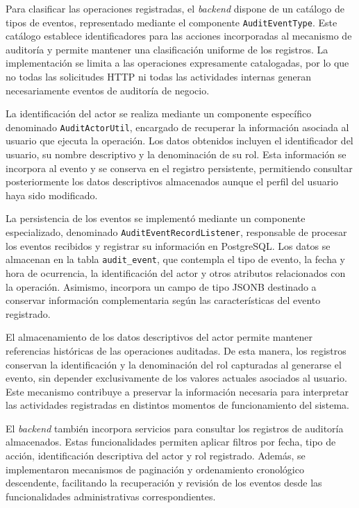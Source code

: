 Para clasificar las operaciones registradas, el \textit{backend} dispone de un catálogo de tipos de eventos, representado mediante el componente \texttt{AuditEventType}. Este catálogo establece identificadores para las acciones incorporadas al mecanismo de auditoría y permite mantener una clasificación uniforme de los registros. La implementación se limita a las operaciones expresamente catalogadas, por lo que no todas las solicitudes HTTP ni todas las actividades internas generan necesariamente eventos de auditoría de negocio.

La identificación del actor se realiza mediante un componente específico denominado \texttt{AuditActorUtil}, encargado de recuperar la información asociada al usuario que ejecuta la operación. Los datos obtenidos incluyen el identificador del usuario, su nombre descriptivo y la denominación de su rol. Esta información se incorpora al evento y se conserva en el registro persistente, permitiendo consultar posteriormente los datos descriptivos almacenados aunque el perfil del usuario haya sido modificado.

La persistencia de los eventos se implementó mediante un componente
especializado, denominado \texttt{AuditEventRecordListener},
responsable de procesar los eventos recibidos y registrar su
información en PostgreSQL. Los datos se
almacenan en la tabla \texttt{audit\_event}, que contempla el tipo de
evento, la fecha y hora de ocurrencia, la identificación del actor y
otros atributos relacionados con la operación. Asimismo, incorpora
un campo de tipo JSONB destinado a conservar información
complementaria según las características del evento registrado.

El almacenamiento de los datos descriptivos del actor permite mantener referencias históricas de las operaciones auditadas. De esta manera, los registros conservan la identificación y la denominación del rol capturadas al generarse el evento, sin depender exclusivamente de los valores actuales asociados al usuario. Este mecanismo contribuye a preservar la información necesaria para interpretar las actividades registradas en distintos momentos de funcionamiento del sistema.

El \textit{backend} también incorpora servicios para consultar los registros de auditoría almacenados. Estas funcionalidades permiten aplicar filtros por fecha, tipo de acción, identificación descriptiva del actor y rol registrado. Además, se implementaron mecanismos de paginación y ordenamiento cronológico descendente, facilitando la recuperación y revisión de los eventos desde las funcionalidades administrativas correspondientes.

